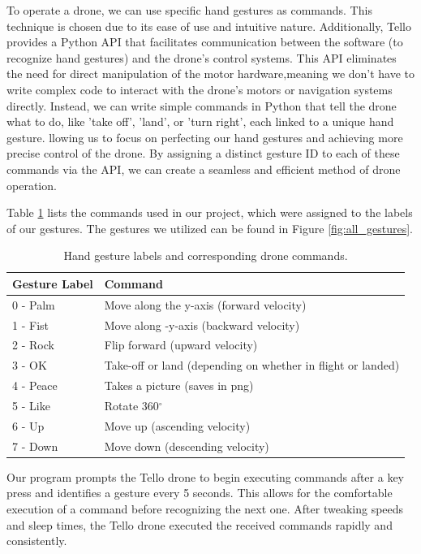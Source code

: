 To operate a drone, we can use specific hand gestures as commands. This technique is chosen due to its ease of use and intuitive nature. Additionally, Tello provides a Python API that facilitates communication between the software (to recognize hand gestures) and the drone's control systems.
This API eliminates the need for direct manipulation of the motor hardware,meaning we don't have to write complex code to interact with the drone's motors or navigation systems directly.  Instead, we can write simple commands in Python that tell the drone what to do, like 'take off', 'land', or 'turn right', each linked to a unique hand gesture. 
llowing us to focus on perfecting our hand gestures and achieving more precise control of the drone. By assigning a distinct gesture ID to each of these commands via the API, we can create a seamless and efficient method of drone operation.



Table \ref{tab:gesture_commands} lists the commands used in our project, which were assigned to the labels of our gestures. The gestures we utilized can be found in Figure \ref{fig:all_gestures}.

\begin{table}[ht]
	\centering
		\caption{ Hand gesture labels and corresponding drone commands. }
	\begin{tabular}{ll}
		\toprule
		Gesture Label & Command \\
		\midrule
		0 - Palm& Move along the y-axis (forward velocity) \\
		1 - Fist& Move along -y-axis (backward velocity) \\
		2 - Rock& Flip forward (upward velocity) \\
		3 - OK & Take-off or land (depending on whether in flight or landed) \\
		4 - Peace& Takes a picture (saves in png) \\
		5 - Like& Rotate 360$^\circ$ \\
		6 - Up& Move up (ascending velocity) \\
		7 - Down & Move down (descending velocity)\\
		\bottomrule
	\end{tabular}

	\label{tab:gesture_commands}
\end{table}

Our program prompts the Tello drone to begin executing commands after a key press and identifies a gesture every 5 seconds. This allows for the comfortable execution of a command before recognizing the next one. After tweaking speeds and sleep times, the Tello drone executed the received commands rapidly and consistently.

